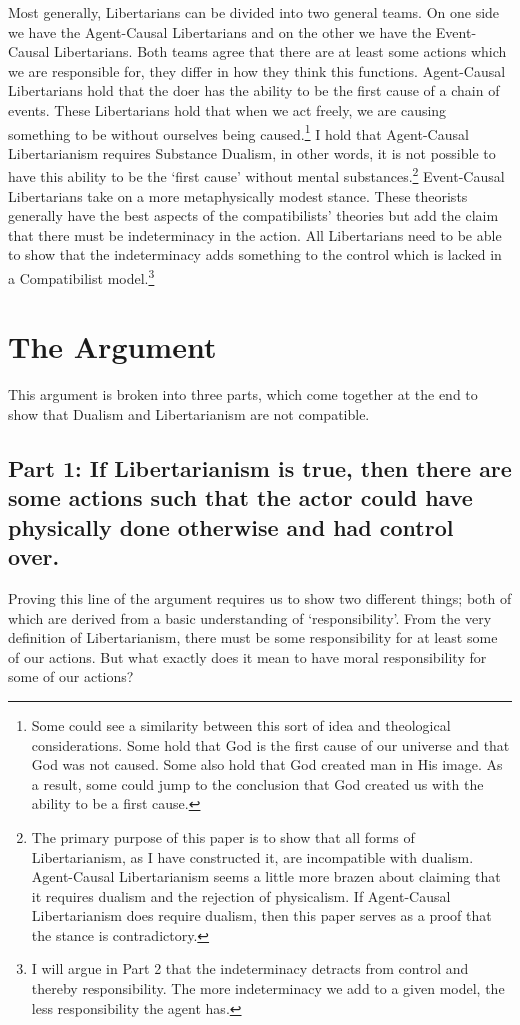 Most generally, Libertarians can be divided into two general teams. On one side we have the Agent-Causal Libertarians and on the other we have the Event-Causal Libertarians. Both teams agree that there are at least some actions which we are responsible for, they differ in how they think this functions. Agent-Causal Libertarians hold that the doer has the ability to be the first cause of a chain of events. These Libertarians hold that when we act freely, we are causing something to be without ourselves being caused.\footnote{\cite[687]{Franklin1} Some could see a similarity between this sort of idea and theological considerations. Some hold that God is the first cause of our universe and that God was not caused. Some also hold that God created man in His image. As a result, some could jump to the conclusion that God created us with the ability to be a first cause.}  I hold that Agent-Causal Libertarianism requires Substance Dualism, in other words, it is not possible to have this ability to be the ‘first cause’ without mental substances.\footnote{The primary purpose of this paper is to show that all forms of Libertarianism, as I have constructed it, are incompatible with dualism. Agent-Causal Libertarianism seems a little more brazen about claiming that it requires dualism and the rejection of physicalism. If Agent-Causal Libertarianism does require dualism, then this paper serves as a proof that the stance is contradictory.}  Event-Causal Libertarians take on a more metaphysically modest stance. These theorists generally have the best aspects of the compatibilists’ theories but add the claim that there must be indeterminacy in the action. All Libertarians need to be able to show that the indeterminacy adds something to the control which is lacked in a Compatibilist model.\footnote{I will argue in Part 2 that the indeterminacy detracts from control and thereby responsibility. The more indeterminacy we add to a given model, the less responsibility the agent has.}
  
\section{The Argument}
This argument is broken into three parts, which come together at the end to show that Dualism and Libertarianism are not compatible. 
\subsection{Part 1: If Libertarianism is true, then there are some actions such that the actor could have physically done otherwise and had control over.} 
Proving this line of the argument requires us to show two different things; both of which are derived from a basic understanding of ‘responsibility'. From the very definition of Libertarianism, there must be some responsibility for at least some of our actions. But what exactly does it mean to have moral responsibility for some of our actions?

